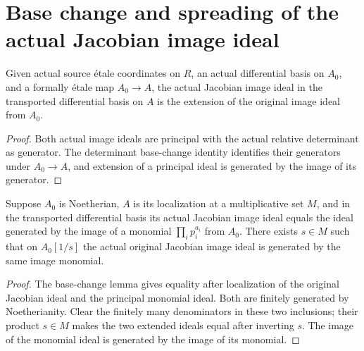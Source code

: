\section{Base change and spreading of the actual Jacobian image ideal}

\begin{lemma}\label{lem:sc0-jacobian-image-ideal-basechange}
\leanok
{}
Given actual source \'etale coordinates on $R$, an actual differential basis on
$A_0$, and a formally \'etale map $A_0\to A$, the actual Jacobian image ideal in
the transported differential basis on $A$ is the extension of the original image
ideal from $A_0$.
\end{lemma}
\begin{proof}
Both actual image ideals are principal with the actual relative determinant as
generator. The determinant base-change identity identifies their generators
under $A_0\to A$, and extension of a principal ideal is generated by the image
of its generator.
\end{proof}

\begin{lemma}\label{lem:sc0-jacobian-monomial-spreading}
\leanok
{}
Suppose $A_0$ is Noetherian, $A$ is its localization at a multiplicative set $M$,
and in the transported differential basis its actual Jacobian image ideal equals
the ideal generated by the image of a monomial $\prod_i p_i^{a_i}$ from $A_0$.
There exists $s\in M$ such that on $A_0[1/s]$ the actual original Jacobian image
ideal is generated by the same image monomial.
\end{lemma}
\begin{proof}
The base-change lemma gives equality after localization of the original Jacobian
ideal and the principal monomial ideal. Both are finitely generated by
Noetherianity. Clear the finitely many denominators in these two inclusions;
their product $s\in M$ makes the two extended ideals equal after inverting $s$.
The image of the monomial ideal is generated by the image of its monomial.
\end{proof}
